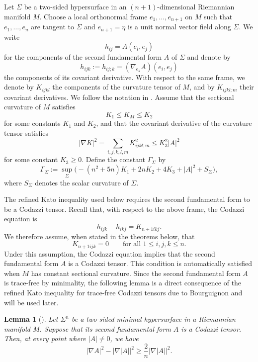 \documentclass[amssymb,amstex,amsmath,11pt]{article}
\numberwithin{equation}{section}
\theoremstyle{plain}
\newtheorem{lem}[thm]{Lemma}
\theoremstyle{definition}
\theoremstyle{remark}
\begin{document}
Let $\Sigma$ be a two-sided hypersurface in an $(n+1)$-dimensional Riemannian manifold $M$. Choose a local orthonormal frame $e_1,\ldots,e_{n+1}$ on $M$ such that $e_1,\ldots,e_n$ are tangent to $\Sigma$ and $e_{n+1}=\eta$ is a unit normal vector field along $\Sigma$. We write
$$
h_{ij}=A(e_i,e_j)
$$
for the components of the second fundamental form $A$ of $\Sigma$ and denote by
$$
h_{ijk}:=h_{ij;k}=(\nabla_{e_k}A)(e_i,e_j)
$$
the components of its covariant derivative. With respect to the same frame, we denote by $K_{ijkl}$ the components of the curvature tensor of $M$, and by $K_{ijkl;m}$ their covariant derivatives. We follow the notation in \cite{Schoen&75}. Assume that the sectional curvature of $M$ satisfies
$$
K_1\le K_M\le K_2
$$
for some constants $K_1$ and $K_2$, and that the covariant derivative of the curvature tensor satisfies
$$
|\nabla K|^2
=
\sum_{i,j,k,l,m}K_{ijkl;m}^2
\le K_3^2|A|^2
$$
for some constant $K_3\ge 0$. Define the constant $\Gamma_\Sigma$ by
$$
\Gamma_\Sigma
:=
\sup_\Sigma
\bigl(
-(n^2+5n)K_1+2nK_2+4K_3+|A|^2+S_\Sigma
\bigr),
$$
where $S_\Sigma$ denotes the scalar curvature of $\Sigma$.


















The refined Kato inequality used below requires the second fundamental form
to be a Codazzi tensor. Recall that, with respect to the above frame, the
Codazzi equation is
$$
h_{ijk}-h_{ikj}=K_{n+1ikj}.
$$
We therefore assume, when stated in the theorems below, that
$$
K_{n+1ijk}=0
\qquad\text{for all }1\le i,j,k\le n.
$$
Under this assumption, the Codazzi equation implies that the second
fundamental form $A$ is a Codazzi tensor. This condition is automatically
satisfied when $M$ has constant sectional curvature. Since the second fundamental form $A$ is trace-free by minimality, the following lemma is a direct consequence of the refined Kato inequality for trace-free Codazzi tensors due to Bourguignon \cite{Bourguignon81} and will be used later.


\begin{lem}[\cite{Bourguignon81}] \label{lem: Kato}
Let $\Sigma^n$ be a two-sided minimal hypersurface in a Riemannian manifold $M$. Suppose that its second fundamental form $A$ is a Codazzi tensor. Then, at every point where $|A|\neq0$, we have
$$
|\nabla A|^2-|\nabla|A||^2\ge \frac{2}{n}|\nabla|A||^2.
$$
\end{lem}
\end{document}
